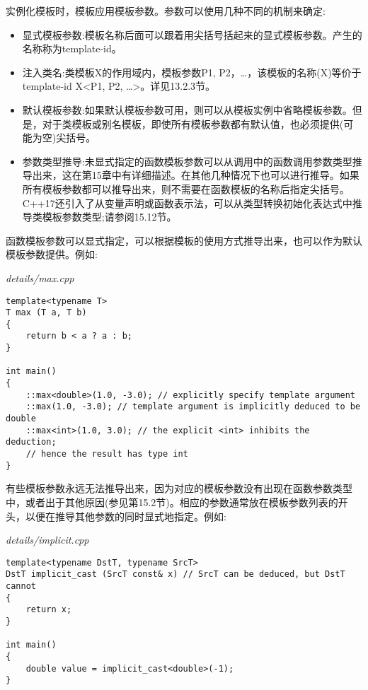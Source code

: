 
实例化模板时，模板应用模板参数。参数可以使用几种不同的机制来确定:

\begin{itemize}
\item 
显式模板参数:模板名称后面可以跟着用尖括号括起来的显式模板参数。产生的名称称为template-id。

\item 
注入类名:类模板X的作用域内，模板参数P1, P2，…，该模板的名称(X)等价于template-id X<P1, P2, …>。详见13.2.3节。

\item 
默认模板参数:如果默认模板参数可用，则可以从模板实例中省略模板参数。但是，对于类模板或别名模板，即使所有模板参数都有默认值，也必须提供(可能为空)尖括号。

\item 
参数类型推导:未显式指定的函数模板参数可以从调用中的函数调用参数类型推导出来，这在第15章中有详细描述。在其他几种情况下也可以进行推导。如果所有模板参数都可以推导出来，则不需要在函数模板的名称后指定尖括号。C++17还引入了从变量声明或函数表示法，可以从类型转换初始化表达式中推导类模板参数类型;请参阅15.12节。
\end{itemize}


函数模板参数可以显式指定，可以根据模板的使用方式推导出来，也可以作为默认模板参数提供。例如:

\noindent
\textit{details/max.cpp}
\begin{lstlisting}[style=styleCXX]
template<typename T>
T max (T a, T b)
{
	return b < a ? a : b;
}

int main()
{
	::max<double>(1.0, -3.0); // explicitly specify template argument
	::max(1.0, -3.0); // template argument is implicitly deduced to be double
	::max<int>(1.0, 3.0); // the explicit <int> inhibits the deduction;
	// hence the result has type int
}
\end{lstlisting}

有些模板参数永远无法推导出来，因为对应的模板参数没有出现在函数参数类型中，或者出于其他原因(参见第15.2节)。相应的参数通常放在模板参数列表的开头，以便在推导其他参数的同时显式地指定。例如:

\noindent
\textit{details/implicit.cpp}
\begin{lstlisting}[style=styleCXX]
template<typename DstT, typename SrcT>
DstT implicit_cast (SrcT const& x) // SrcT can be deduced, but DstT cannot
{
	return x;
}

int main()
{
	double value = implicit_cast<double>(-1);
}
\end{lstlisting}

